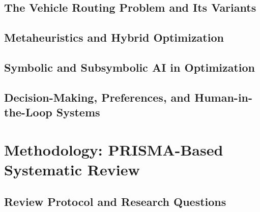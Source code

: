 \documentclass[preprint,12pt]{elsarticle}
\begin{document}
	\subsection{The Vehicle Routing Problem and Its Variants}
	
	\subsection{Metaheuristics and Hybrid Optimization}
	
	\subsection{Symbolic and Subsymbolic AI in Optimization}
	
	\subsection{Decision-Making, Preferences, and Human-in-the-Loop Systems}
	
	\section{Methodology: PRISMA-Based Systematic Review}
	
	\subsection{Review Protocol and Research Questions}
	
\end{document}
